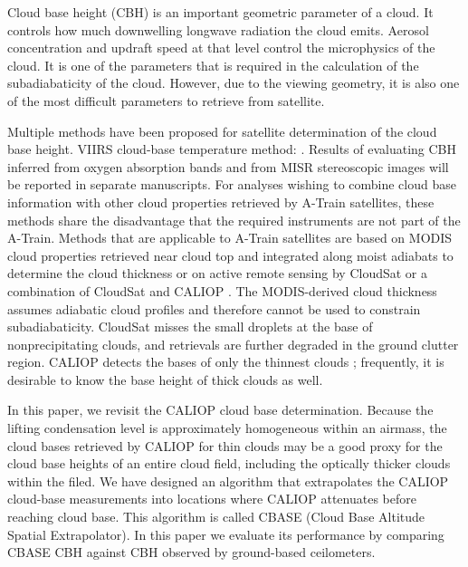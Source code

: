 \documentclass[essd,manuscript]{copernicus}\usepackage[]{graphicx}\usepackage[]{color}
\begin{document}
\introduction  %
\label{sec:intro}
Cloud base height (CBH) is an important geometric parameter of a cloud.  It controls
how much downwelling longwave radiation the cloud emits.  Aerosol concentration
and updraft speed at that level control the microphysics of the cloud.  It is
one of the parameters that is required in the calculation of the subadiabaticity
of the cloud.  However, due to the viewing geometry, it is also one of the most
difficult parameters to retrieve from satellite.  

Multiple methods have been proposed for satellite determination of the cloud
base height.  VIIRS cloud-base temperature method: \cite{zhu14}.  Results of
evaluating CBH inferred from oxygen absorption bands and from MISR stereoscopic
images will be reported in separate manuscripts.  For analyses wishing to
combine cloud base information with other cloud properties retrieved by A-Train
satellites, these methods share the disadvantage that the required instruments
are not part of the A-Train.  Methods that are applicable to A-Train satellites
are based on MODIS cloud properties retrieved near cloud top and integrated
along moist adiabats to determine the cloud thickness \citep{meerkoetter07} or
on active remote sensing by CloudSat \citep[][2B-GEOPROF]{marchand08} or a
combination of CloudSat and CALIOP \citep[][2B-GEOPROF-LIDAR]{mace14}.  The
MODIS-derived cloud thickness assumes adiabatic cloud profiles and therefore
cannot be used to constrain subadiabaticity.  CloudSat misses the small droplets
at the base of nonprecipitating clouds, and retrievals are further degraded in
the ground clutter region.  CALIOP detects the bases of only the thinnest clouds
\citep[][$\tau < 5$]{mace14}; frequently, it is desirable to know the base
height of thick clouds as well.

In this paper, we revisit the CALIOP cloud base determination.  Because the
lifting condensation level is approximately homogeneous within an airmass, the
cloud bases retrieved by CALIOP for thin clouds may be a good proxy for the cloud
base heights of an entire cloud field, including the optically thicker clouds
within the filed.  We have designed an algorithm that extrapolates the CALIOP
cloud-base measurements into locations where CALIOP attenuates before reaching
cloud base.  This algorithm is called CBASE (Cloud Base Altitude Spatial
Extrapolator).  In this paper we evaluate its performance by comparing CBASE
CBH against CBH observed by ground-based
ceilometers.
\end{document}
